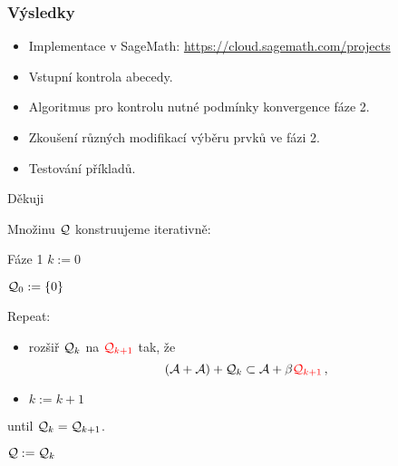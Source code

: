 \documentclass[11pt]{beamer}
\begin{document}
\begin{frame}
    \frametitle{Výsledky}    
    \begin{itemize}
        \item Implementace v SageMath: \url{https://cloud.sagemath.com/projects}
        \item Vstupní kontrola abecedy.
        \item Algoritmus pro kontrolu nutné podmínky konvergence fáze 2.
        \item Zkoušení různých modifikací výběru prvků ve fázi 2.
        \item Testování příkladů.
    \end{itemize}
\end{frame}


\begin{frame}
\fontsize{14pt}{10}\selectfont
\begin{center}
Děkuji

\end{center}    

\end{frame}


\begin{frame}
    Množinu $\mathcal{Q}$ konstruujeme iterativně:
    \begin{block}{Fáze 1}
     $k:=0$
     
    $\mathcal{Q}_0:=\{0\}$
      
      \pause
      Repeat:
      \begin{itemize}
          \item rozšiř $\mathcal{Q}_k$ na $\textcolor{red}{\mathcal{Q}_{k+1}}$ tak, že
           $$
              (\mathcal{A}+\mathcal{A})+ \mathcal{Q}_k \subset \mathcal{A} + \beta \textcolor{red}{\mathcal{Q}_{k+1}}\,,
           $$
           \item $k:=k+1$
      \end{itemize}
      \pause
      until $\mathcal{Q}_k = \mathcal{Q}_{k+1}$.
      
      \pause
      \vspace{7pt}
      $\mathcal{Q}:=\mathcal{Q}_k$
    \end{block}
\end{frame}
\end{document}
